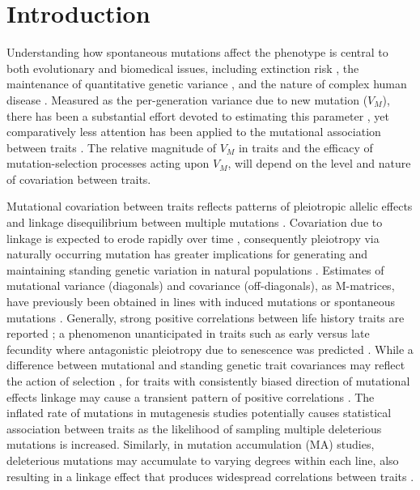 \section{Introduction}

Understanding how spontaneous mutations affect the phenotype is central to both evolutionary and biomedical issues, including extinction risk \citep{Land94, lync95,Loew06}, the maintenance of quantitative genetic variance \citep{Burg00, John05}, and the nature of complex human disease \citep{John20}. Measured as the per-generation variance due to new mutation ($V_M$), there has been a substantial effort devoted to estimating this parameter \citep[][Chapter 12]{Houl96, Hall09, Wals18c12}, yet comparatively less attention has been applied to the mutational association between traits \citep{Jone03,Jone07,Este06}. The relative magnitude of $V_M$ in traits and the efficacy of mutation-selection processes acting upon $V_M$, will depend on the level and nature of covariation between traits. \par
Mutational covariation between traits reflects patterns of pleiotropic allelic effects and linkage disequilibrium between multiple mutations \citep{Land80,Falc96,Phil06}. Covariation due to linkage is expected to erode rapidly over time \citep{Land80}, consequently pleiotropy via naturally occurring mutation has greater implications for generating and maintaining standing genetic variation in natural populations \citep{John05}. Estimates of mutational variance (diagonals) and covariance (off-diagonals), as M-matrices, have previously been obtained in lines with induced mutations \citealp{Cama00, Keig00} or spontaneous mutations \citep[e.g.,][]{Houl94, Este04,Mall23}. Generally, strong positive correlations between life history traits are reported \citep{Houl94, Keig00,Este06}; a phenomenon unanticipated in traits such as early versus late fecundity where antagonistic pleiotropy due to senescence was predicted \citep{Houl94}. While a difference between mutational and standing genetic trait covariances may reflect the action of selection \citep{Este06}, for traits with consistently biased direction of mutational effects \citep[i.e., mutations typically decrease fitness:][]{Hall09} linkage may cause a transient pattern of positive correlations \citep{Keig00}. The inflated rate of mutations in mutagenesis studies potentially causes statistical association between traits as the likelihood of sampling multiple deleterious mutations is increased. Similarly, in mutation accumulation (MA) studies, deleterious mutations may accumulate to varying degrees within each line, also resulting in a linkage effect that produces widespread correlations between traits \citep{Keig00}. \par

